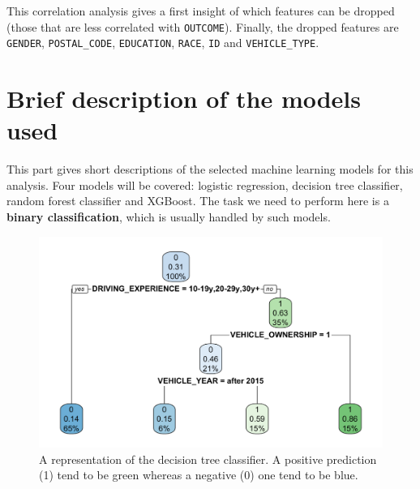 \documentclass[a4paper,11pt, titlepage]{article}
\begin{document}
\noindent This correlation analysis gives a first insight of which features can be dropped (those that are less correlated with {\tt OUTCOME}). Finally, the dropped features are {\tt GENDER}, {\tt POSTAL\_CODE}, {\tt EDUCATION}, {\tt RACE}, {\tt ID} and {\tt VEHICLE\_TYPE}.


\section{Brief description of the models used} \label{models}

This part gives short descriptions of the selected machine learning models for this analysis. Four models will be covered: logistic regression, decision tree classifier, random forest classifier and XGBoost. The task we need to perform here is a \textbf{binary classification}, which is usually handled by such models. 

\begin{figure}
    \centering
    \includegraphics[width=\textwidth]{decision-tree-fit.png}
    \caption{A representation of the decision tree classifier. A positive prediction (1) tend to be green whereas a negative (0) one tend to be blue.}
\end{figure}


\end{document}
